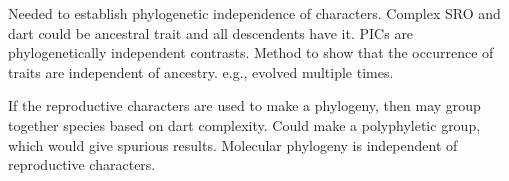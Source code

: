 \documentclass[12pt]{exam}
\begin{document}
\begin{questions}
\ifprintanswers\begin{solution}
Needed to establish phylogenetic independence of characters.  Complex SRO and dart could be ancestral trait and all descendents have it.  PICs are phylogenetically independent contrasts.  Method to show that the occurrence of traits are independent of ancestry.  e.g., evolved multiple times.

If the reproductive characters are used to make a phylogeny, then may group together species based on dart complexity.  Could make a polyphyletic group, which would give spurious results.  Molecular phylogeny is independent of reproductive characters.
\end{solution}
\else{}
\fi

\end{questions}
\end{document}
